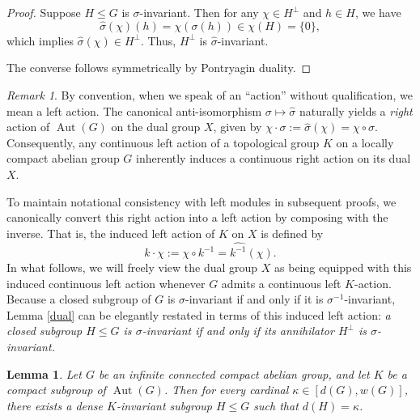 \documentclass[12pt]{amsart}
\newtheorem{lemma}[theorem]{Lemma}
\theoremstyle{definition}
\numberwithin{equation}{section}
\theoremstyle{remark}
\newtheorem{remark}[theorem]{Remark}
\def\Aut{\operatorname{Aut}}
\begin{document}
\begin{proof}
Suppose $H \leq G$ is $\sigma$-invariant. Then for any $\chi \in H^\perp$ and $h \in H$, we have
\[
\widehat{\sigma}(\chi)(h) = \chi(\sigma(h)) \in \chi(H) = \{0\},
\]
which implies $\widehat{\sigma}(\chi) \in H^\perp$. Thus, $H^\perp$ is $\widehat{\sigma}$-invariant.

The converse follows symmetrically by Pontryagin duality.
\end{proof}

\begin{remark}\label{action}
By convention, when we speak of an ``action'' without qualification, we mean a left action. The canonical anti-isomorphism $\sigma \mapsto \widehat{\sigma}$ naturally yields a \emph{right} action of $\Aut(G)$ on the dual group $X$, given by $\chi \cdot \sigma := \widehat{\sigma}(\chi) = \chi \circ \sigma$. Consequently, any continuous left action of a topological group $K$ on a locally compact abelian group $G$ inherently induces a continuous right action on its dual $X$.

To maintain notational consistency with left modules in subsequent proofs, we canonically convert this right action into a left action by composing with the inverse. That is, the induced left action of $K$ on $X$ is defined by
\[
k \cdot \chi := \chi \circ k^{-1} = \widehat{k^{-1}}(\chi).
\]
In what follows, we will freely view the dual group $X$ as being equipped with this induced continuous left action whenever $G$ admits a continuous left $K$-action. Because a closed subgroup of $G$ is $\sigma$-invariant if and only if it is $\sigma^{-1}$-invariant, Lemma \ref{dual} can be elegantly restated in terms of this induced left action: \emph{a closed subgroup $H \leq G$ is $\sigma$-invariant if and only if its annihilator $H^\perp$ is $\sigma$-invariant.}
\end{remark}

\begin{lemma}\label{abinv}
Let $G$ be an infinite connected compact abelian group, and let $K$ be a compact subgroup of $\Aut(G)$. Then for every cardinal $\kappa \in [d(G), w(G)]$, there exists a dense $K$-invariant subgroup $H \leq G$ such that $d(H) = \kappa$.
\end{lemma}
\end{document}
